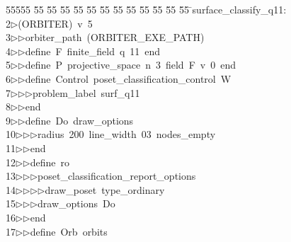 %
%
\begin{tabbing}
55555 \= 55 \= 55 \= 55 \= 55 \= 55 \= 55 \= 55 \= 55 \= 55 \= 55 \= 55 \= 55 \= \>surface\_classify\_q11:\\[0pt]
2\>$\triangleright$\>(ORBITER)\ v\ 5\ \\[0pt]
3\>$\triangleright$\>$\triangleright$\>orbiter\_path\ (ORBITER\_EXE\_PATH)\ \\[0pt]
4\>$\triangleright$\>$\triangleright$\>define\ F\ finite\_field\ q\ 11\ end\ \\[0pt]
5\>$\triangleright$\>$\triangleright$\>define\ P\ projective\_space\ n\ 3\ field\ F\ v\ 0\ end\ \\[0pt]
6\>$\triangleright$\>$\triangleright$\>define\ Control\ poset\_classification\_control\ W\ \\[0pt]
7\>$\triangleright$\>$\triangleright$\>$\triangleright$\>problem\_label\ surf\_q11\ \\[0pt]
8\>$\triangleright$\>$\triangleright$\>end\ \\[0pt]
9\>$\triangleright$\>$\triangleright$\>define\ Do\ draw\_options\ \\[0pt]
10\>$\triangleright$\>$\triangleright$\>$\triangleright$\>radius\ 200\ line\_width\ 03\ nodes\_empty\ \\[0pt]
11\>$\triangleright$\>$\triangleright$\>end\ \\[0pt]
12\>$\triangleright$\>$\triangleright$\>define\ ro\ \\[0pt]
13\>$\triangleright$\>$\triangleright$\>$\triangleright$\>poset\_classification\_report\_options\ \\[0pt]
14\>$\triangleright$\>$\triangleright$\>$\triangleright$\>$\triangleright$\>draw\_poset\ type\_ordinary\ \\[0pt]
15\>$\triangleright$\>$\triangleright$\>$\triangleright$\>draw\_options\ Do\ \\[0pt]
16\>$\triangleright$\>$\triangleright$\>end\ \\[0pt]
17\>$\triangleright$\>$\triangleright$\>define\ Orb\ orbits\ \\[0pt]

\end{tabbing}
